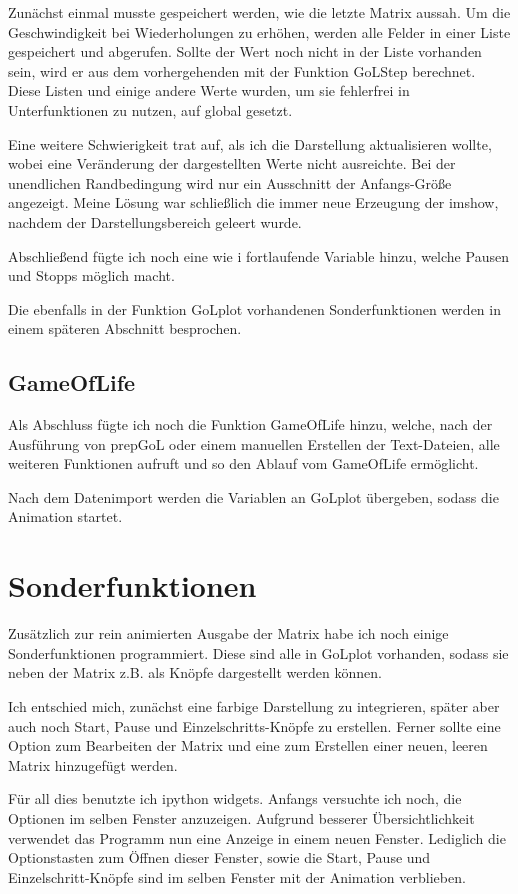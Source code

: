 \documentclass{scrartcl}
\begin{document}
Zunächst einmal musste gespeichert werden, wie die letzte  Matrix aussah. Um die Geschwindigkeit bei Wiederholungen zu erhöhen, werden alle Felder in einer Liste gespeichert und abgerufen. Sollte der Wert noch nicht in der Liste vorhanden sein, wird er aus dem vorhergehenden mit der Funktion GoLStep berechnet. Diese Listen und einige andere Werte wurden, um sie fehlerfrei in Unterfunktionen zu nutzen, auf global gesetzt.

Eine weitere Schwierigkeit trat auf, als ich die Darstellung aktualisieren wollte, wobei eine Veränderung der dargestellten Werte nicht ausreichte. Bei der unendlichen Randbedingung wird nur ein Ausschnitt der Anfangs-Größe angezeigt. Meine Lösung war schließlich die immer neue Erzeugung der imshow, nachdem der Darstellungsbereich geleert wurde.

Abschließend fügte ich noch eine wie i fortlaufende Variable hinzu, welche Pausen und Stopps möglich macht.

Die ebenfalls in der Funktion GoLplot vorhandenen Sonderfunktionen werden in einem späteren Abschnitt besprochen.

\subsection{GameOfLife}
Als Abschluss fügte ich noch die Funktion GameOfLife hinzu, welche, nach der Ausführung von prepGoL oder einem manuellen Erstellen der Text-Dateien, alle weiteren Funktionen aufruft und so den Ablauf vom GameOfLife ermöglicht.

Nach dem Datenimport werden die Variablen an GoLplot übergeben, sodass die Animation startet.

\section{Sonderfunktionen}
Zusätzlich zur rein animierten Ausgabe der Matrix habe ich noch einige Sonderfunktionen programmiert. Diese sind alle in GoLplot vorhanden, sodass sie neben der Matrix z.B. als Knöpfe dargestellt werden können.

Ich entschied mich, zunächst eine farbige Darstellung zu integrieren, später aber auch noch Start, Pause und Einzelschritts-Knöpfe zu erstellen. Ferner sollte eine Option zum Bearbeiten der Matrix und eine zum Erstellen einer neuen, leeren Matrix hinzugefügt werden.

Für all dies benutzte ich ipython widgets.
Anfangs versuchte ich noch, die Optionen im selben Fenster anzuzeigen. Aufgrund besserer Übersichtlichkeit verwendet das Programm nun eine Anzeige in einem neuen Fenster. Lediglich die Optionstasten zum Öffnen dieser Fenster, sowie die Start, Pause und Einzelschritt-Knöpfe sind im selben Fenster mit der Animation verblieben.
\end{document}
